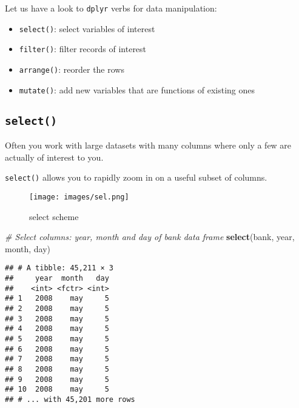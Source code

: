 \documentclass[]{book}
\newenvironment{Shaded}{\begin{snugshade}}{\end{snugshade}}
\newcommand{\KeywordTok}[1]{\textcolor[rgb]{0.13,0.29,0.53}{\textbf{{#1}}}}
\newcommand{\StringTok}[1]{\textcolor[rgb]{0.31,0.60,0.02}{{#1}}}
\newcommand{\CommentTok}[1]{\textcolor[rgb]{0.56,0.35,0.01}{\textit{{#1}}}}
\newcommand{\NormalTok}[1]{{#1}}
\providecommand{\tightlist}{%
  \setlength{\itemsep}{0pt}\setlength{\parskip}{0pt}}
\def\tightlist{}
\begin{document}
Let us have a look to \texttt{dplyr} verbs for data manipulation:

\begin{itemize}
\tightlist
\item
  \texttt{select()}: select variables of interest
\item
  \texttt{filter()}: filter records of interest
\item
  \texttt{arrange()}: reorder the rows
\item
  \texttt{mutate()}: add new variables that are functions of existing
  ones
\end{itemize}

\subsection{\texorpdfstring{\texttt{select()}}{select()}}\label{select}

Often you work with large datasets with many columns where only a few
are actually of interest to you.

\texttt{select()} allows you to rapidly zoom in on a useful subset of
columns.

\begin{figure}[htbp]
\centering
\texttt{[image: images/sel.png]}
\caption{select scheme}
\end{figure}

\begin{Shaded}
\begin{Highlighting}[]
\CommentTok{# Select columns: year, month and day of bank data frame}
\KeywordTok{select}\NormalTok{(bank, year, month, day)}
\end{Highlighting}
\end{Shaded}

\begin{verbatim}
## # A tibble: 45,211 × 3
##     year  month   day
##    <int> <fctr> <int>
## 1   2008    may     5
## 2   2008    may     5
## 3   2008    may     5
## 4   2008    may     5
## 5   2008    may     5
## 6   2008    may     5
## 7   2008    may     5
## 8   2008    may     5
## 9   2008    may     5
## 10  2008    may     5
## # ... with 45,201 more rows
\end{verbatim}

\begin{Shaded}
\end{Shaded}
\end{document}
